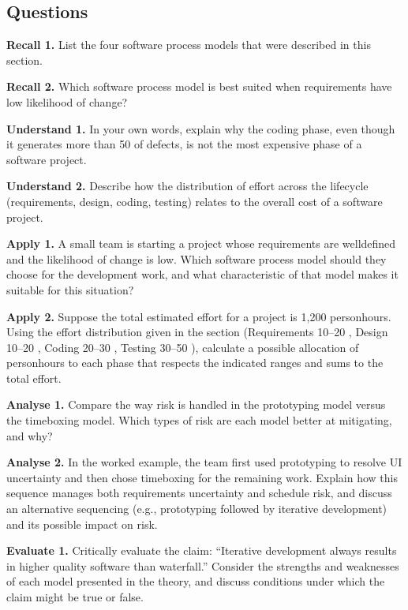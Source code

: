 \documentclass[12pt, a4paper]{article}
\begin{document}
\subsection{Questions}
\newpage
\textbf{Recall 1.} List the four software process models that were described in this section.

\newpage
\textbf{Recall 2.} Which software process model is best suited when requirements have low likelihood of change?

\newpage
\textbf{Understand 1.} In your own words, explain why the coding phase, even though it generates more than 50 of defects, is not the most expensive phase of a software project.

\newpage
\textbf{Understand 2.} Describe how the distribution of effort across the lifecycle (requirements, design, coding, testing) relates to the overall cost of a software project.

\newpage
\textbf{Apply 1.} A small team is starting a project whose requirements are welldefined and the likelihood of change is low.  Which software process model should they choose for the development work, and what characteristic of that model makes it suitable for this situation?

\newpage
\textbf{Apply 2.} Suppose the total estimated effort for a project is 1,200 personhours.  
Using the effort distribution given in the section (Requirements 10--20 , Design 10--20 , Coding 20--30 , Testing 30--50 ), calculate a possible allocation of personhours to each phase that respects the indicated ranges and sums to the total effort.

\newpage
\textbf{Analyse 1.} Compare the way risk is handled in the prototyping model versus the timeboxing model.  Which types of risk are each model better at mitigating, and why?

\newpage
\textbf{Analyse 2.} In the worked example, the team first used prototyping to resolve UI uncertainty and then chose timeboxing for the remaining work.  Explain how this sequence manages both requirements uncertainty and schedule risk, and discuss an alternative sequencing (e.g., prototyping followed by iterative development) and its possible impact on risk.

\newpage
\textbf{Evaluate 1.} Critically evaluate the claim: ``Iterative development always results in higher quality software than waterfall.''  Consider the strengths and weaknesses of each model presented in the theory, and discuss conditions under which the claim might be true or false.
\end{document}
